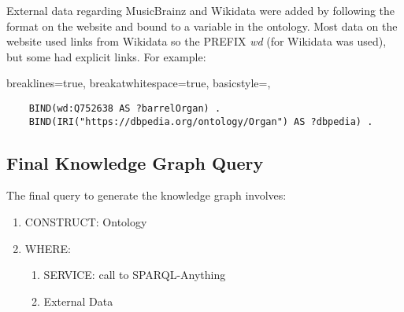 External data regarding MusicBrainz and Wikidata were added by following the format on the website and bound to a variable in the ontology. Most data on the website used links from Wikidata so the PREFIX \textit{wd} (for Wikidata was used), but some had explicit links. For example:

\lstset
{
    breaklines=true,
    breakatwhitespace=true,
    basicstyle=\ttfamily,
}
\begin{lstlisting}
    BIND(wd:Q752638 AS ?barrelOrgan) . 
    BIND(IRI("https://dbpedia.org/ontology/Organ") AS ?dbpedia) .
\end{lstlisting}

\subsection{Final Knowledge Graph Query}
\hspace*{0.5cm} The final query to generate the knowledge graph involves: 

\begin{enumerate}
    \item CONSTRUCT: Ontology
    \item WHERE:
    \begin{enumerate}
        \item SERVICE: call to SPARQL-Anything
        \item External Data
    \end{enumerate}
\end{enumerate}

